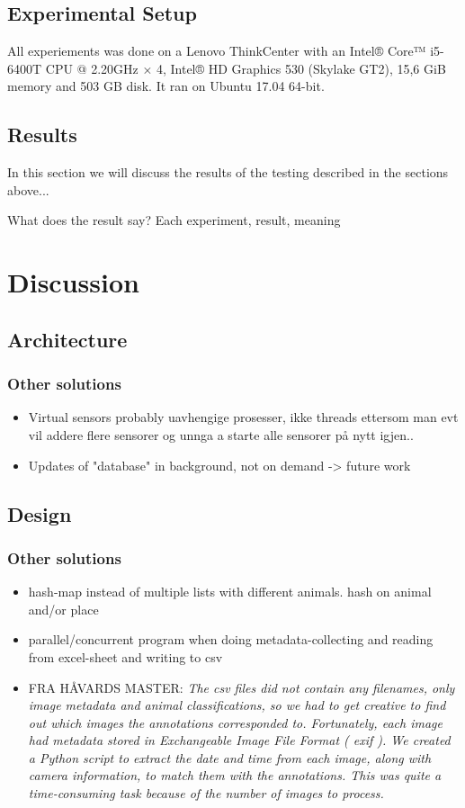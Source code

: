\documentclass[USenglish]{uit-thesis}
\begin{document}
\section{Experimental Setup}
All experiements was done on a Lenovo ThinkCenter with an Intel® Core™ i5-6400T CPU @ 2.20GHz × 4, Intel® HD Graphics 530 (Skylake GT2), 15,6 GiB memory and 503 GB disk. It ran on Ubuntu 17.04 64-bit.


\section{Results}
In this section we will discuss the results of the testing described in the sections above...

What does the result say?
Each experiment, result, meaning


\chapter{Discussion}

\section{Architecture}
\subsection{Other solutions}
\begin{itemize}
\item Virtual sensors probably uavhengige prosesser, ikke threads ettersom man evt vil addere flere sensorer og unnga a starte alle sensorer på nytt igjen..
\item Updates of "database" in background, not on demand -> future work
\end{itemize}

\section{Design}
\subsection{Other solutions}
\begin{itemize}
\item hash-map instead of multiple lists with different animals. hash on animal and/or place
\item parallel/concurrent program when doing metadata-collecting and reading from excel-sheet and writing to csv
\item FRA HÅVARDS MASTER: \textit{The csv files did not contain any filenames, only image metadata and animal classifications, so we had to get creative to find out which images the annotations corresponded to. Fortunately, each image had metadata stored in Exchangeable Image File Format ( exif ). We created a Python script to extract the date and time from each image, along with camera information, to match them with the annotations. This was quite a time-consuming task because of the number of images to process.}
\end{itemize}
\end{document}
